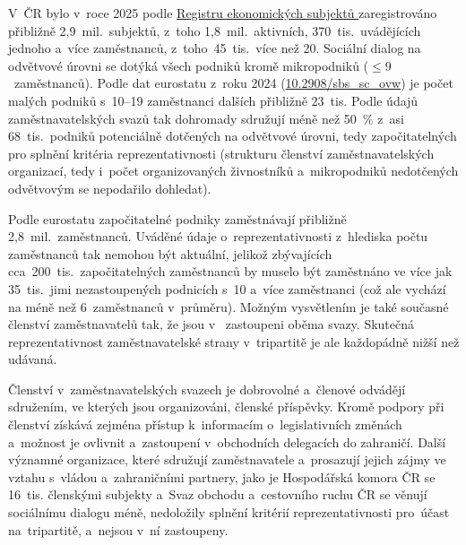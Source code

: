 V~\acs{ČR} bylo v~roce 2025 podle \href{https://csu.gov.cz/statistiky-z-registru-ekonomickych-subjektu}{Registru ekonomických subjektů } zaregistrováno přibližně 2,9~mil.~subjektů, z~toho 1,8~mil.~aktivních, 370~tis.~uvádějících jednoho a~více zaměstnanců, z~toho~45~tis.~více než 20. Sociální dialog na odvětvové úrovni se dotýká všech podniků kromě mikropodniků ($\leq9$~zaměstnanců). Podle dat eurostatu z~roku 2024 (\href{https://doi.org/10.2908/SBS_SC_OVW}{10.2908/sbs\_sc\_ovw}) je počet malých podniků s~10--19 zaměstnanci dalších přibližně 23~tis. Podle údajů zaměstnavatelských svazů tak dohromady sdružují méně než \SI{50}{\percent} z~asi 68~tis.~podniků potenciálně dotčených  na odvětvové úrovni, tedy započitatelných pro splnění kritéria reprezentativnosti (strukturu členství zaměstnavatelských organizací, tedy i~počet organizovaných živnostníků a~mikropodniků nedotčených odvětvovým  se nepodařilo dohledat).\par
Podle eurostatu započitatelné podniky zaměstnávají přibližně 2,8~mil.~zaměstnanců. Uváděné údaje o~reprezentativnosti z~hlediska počtu zaměstnanců tak nemohou být aktuální, jelikož zbývajících cca~200~tis.~započitatelných zaměstnanců by muselo být zaměstnáno ve více jak 35~tis.~jimi nezastoupených podnicích s~10 a~více zaměstnanci (což ale vychází na méně než 6~zaměstnanců v~průměru). Možným vysvětlením je také současné členství zaměstnavatelů tak, že jsou v~ zastoupeni oběma svazy. Skutečná reprezentativnost zaměstnavatelské strany v~tripartitě je ale každopádně nižší než udávaná.\par
Členství v~zaměstnavatelských svazech je dobrovolné a~členové odvádějí sdružením, ve kterých jsou organizováni, členské příspěvky. Kromě podpory při  členství získává zejména přístup k~informacím o~legislativních změnách a~možnost je ovlivnit a~zastoupení v~obchodních delegacích do zahraničí.
Další významné organizace, které sdružují zaměstnavatele a~prosazují jejich zájmy ve vztahu s~vládou a~zahraničními partnery, jako je Hospodářská komora \acs{ČR} se 16~tis. členskými subjekty a~Svaz obchodu a~cestovního ruchu \acs{ČR} se věnují sociálnímu dialogu méně, nedoložily splnění kritérií reprezentativnosti pro~účast na~tripartitě, a~nejsou v~ní zastoupeny.~\cite{Eurofound_CZ_Actors2024}\par

